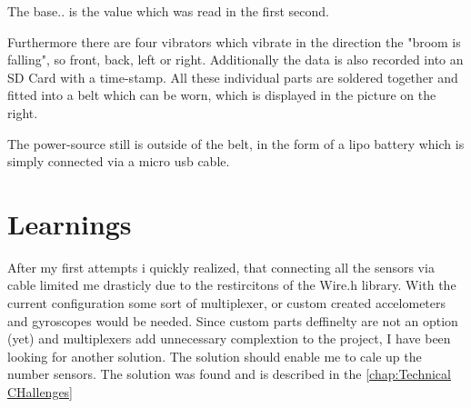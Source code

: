 The base.. is the value which was read in the first second. 

Furthermore there are four vibrators  which vibrate in the direction the "broom is falling", so front, back, left or right. Additionally the data is also recorded into an SD Card with a time-stamp. All these individual parts are soldered together and fitted into a belt which can be worn, which is displayed in the picture on the right.

The power-source still is outside of the belt, in the form of a lipo battery which is simply connected via a micro usb cable.

\section{Learnings}

After my first attempts i quickly realized, that connecting all the sensors via cable limited me drasticly due to the restircitons of the Wire.h library. With the current configuration some sort of multiplexer, or custom created accelometers and gyroscopes would be needed. Since custom parts deffinelty are not an option (yet) and multiplexers add unnecessary complextion to the project, I have been looking for another solution. The solution should enable me to cale up the number sensors. The solution was found and is described in the \ref{chap:Technical CHallenges}

